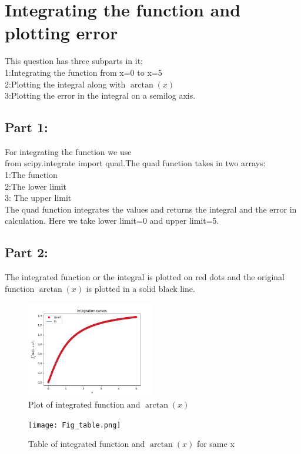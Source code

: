 \documentclass[11pt, a3paper, twocolumn]{article}
\begin{document}
\section{Integrating the function and plotting error}
This question has three subparts in it:\\
1:Integrating the function from x=0 to x=5\\
2:Plotting the integral along with $\arctan(x)$\\
3:Plotting the error in the integral on a semilog axis.\\


\subsection{Part 1:}
For integrating the function we use \\
{\selectfont
from scipy.integrate import quad}.The {\selectfont quad} function takes in two arrays:\\
1:The function\\
2:The lower limit\\
3: The upper limit\\
The quad function integrates the values and returns the integral and the error in calculation.
Here we take lower limit=0 and upper limit=5.


\subsection{Part 2:}
The integrated function or the integral is plotted on red dots and the original function $\arctan(x)$ is plotted in a solid black line.
\begin{figure}[h!]
\includegraphics[width=0.5\textwidth, right]{Fig2.png}
 \caption{Plot of integrated function and $\arctan(x)$}
\end{figure}

\begin{figure}[h!]
  \texttt{[image: Fig\_table.png]}
  \caption{Table of integrated function and $\arctan(x)$ for same x}
\end{figure}
\end{document}
